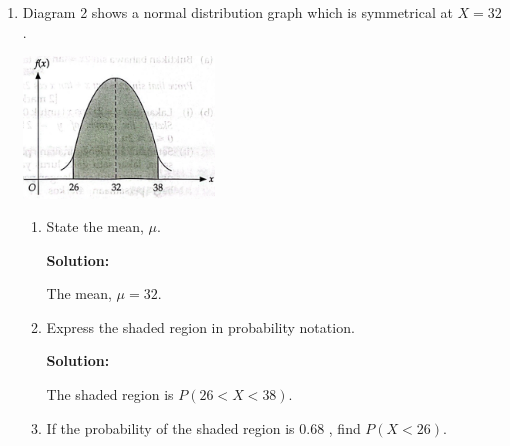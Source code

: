 \documentclass{report}
\newcommand{\sol}{\textbf{Solution:}}
\newcommand\permtwo[2][^n]{{}_{#1}P_{#2}}
\begin{document}
\begin{enumerate}[leftmargin=*]
\begin{enumerate}
                    \sol{}

                    First, choose the thousands place. Since the number must be less than 7000, the
                    thousands place can only be 4 or 5.

                    If the thousands place is 4, then the units place can be filled in 3 ways.

                    If the thousands place is 5, then the units place can be filled in 2 ways.

                    The tens and hundreds place can be filled in $\permtwo[2]{2} = 2$ ways.

                    The total number of ways to form the 4-digit odd numbers is $(3+2)2 = 10$.

              \item Diagram 2 shows a normal distribution graph which is symmetrical at $X=32$.

                    \begin{center}
                        \includegraphics[width=0.4\textwidth]{./assets/7b.png}
                    \end{center}
                    \begin{enumerate}
                        \item State the mean, $\mu$.

                              \sol{}

                              The mean, $\mu = 32$.

                              \newpage

                        \item Express the shaded region in probability notation.

                              \sol{}

                              The shaded region is $P(26<X<38)$.

                        \item If the probability of the shaded region is 0.68 , find $P(X<26)$.


\end{enumerate}
\end{enumerate}
\end{enumerate}
\end{document}
